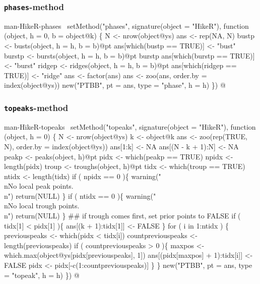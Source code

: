 \documentclass[a4paper]{article}
\begin{document}
\subsubsection{\texttt{phases}-method}

\nwenddocs{}\endmoddef
\LA{}man-HikeR-phases~{\nwtagstyle{}}\RA{}
setMethod("phases",
    signature(object = "HikeR"),
    function (object, h = 0, b = object@k) \{
        N <- nrow(object@ys)
        ans <- rep(NA, N)
        bustp <- busts(object, h = h, b = b)@pt
        ans[which(bustp == TRUE)] <- "bust"
        burstp <- bursts(object, h = h, b = b)@pt
        burstp
        ans[which(burstp == TRUE)] <- "burst"
        ridgep <- ridges(object, h = h, b = b)@pt
        ans[which(ridgep == TRUE)] <- "ridge"
        ans <- factor(ans)
        ans <- zoo(ans, order.by = index(object@ys))
        new("PTBB", pt = ans, type = "phase", h = h)
\})
\nwendcode{}@

\subsubsection{\texttt{topeaks}-method}

\nwenddocs{}\endmoddef
\LA{}man-HikeR-topeaks~{\nwtagstyle{}}\RA{}
setMethod("topeaks",
    signature(object = "HikeR"),
    function (object, h = 0) \{
        N <- nrow(object@ys)
        k <- object@k
        ans <- zoo(rep(TRUE, N), order.by = index(object@ys))
        ans[1:k] <- NA
        ans[(N - k + 1):N] <- NA
        peakp <- peaks(object, h)@pt
        pidx <- which(peakp == TRUE)
        npidx <- length(pidx)
        troup <- troughs(object, h)@pt
        tidx <- which(troup == TRUE)
        ntidx <- length(tidx)
        if ( npidx == 0 )\{
            warning("\\nNo local peak points.\\n")
            return(NULL)
        \}
        if ( ntidx == 0 )\{
            warning("\\nNo local trough points.\\n")
            return(NULL)
        \}
        ## if trough comes first, set prior points to FALSE
        if ( tidx[1] < pidx[1] )\{
            ans[(k + 1):tidx[1]] <- FALSE
        \}
        for ( i in 1:ntidx ) \{
            previouspeaks <- which(pidx < tidx[i])
            countpreviouspeaks <- length(previouspeaks)
            if ( countpreviouspeaks > 0 )\{
                maxpos <- which.max(object@ys[pidx[previouspeaks], 1])
                ans[(pidx[maxpos] + 1):tidx[i]] <- FALSE
                pidx <- pidx[-c(1:countpreviouspeaks)]
            \}
        \}
        new("PTBB", pt = ans, type = "topeak", h = h)
\})
\nwendcode{}@
\end{document}
